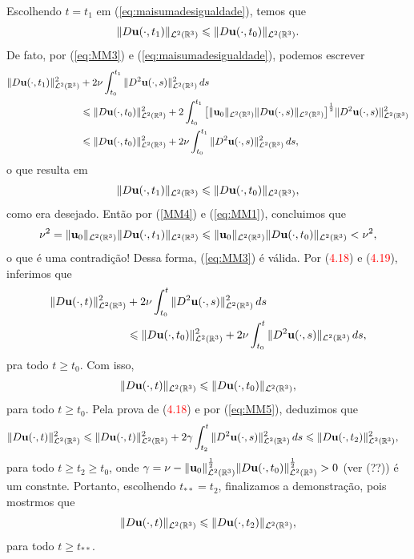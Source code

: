 \begin{prf}
    Escolhendo $t=t_1$ em (\ref{eq:maisumadesigualdade}), temos que
    \[
        \Vert D\mathbf{u}(\cdot,t_1) \Vert_{\mathcal{L}^2(\mathbb{R}^3)} \leqslant \Vert D\mathbf{u}(\cdot,t_0) \Vert_{\mathcal{L}^2(\mathbb{R}^3)}.
    \]
    De fato, por (\ref{eq:MM3}) e (\ref{eq:maisumadesigualdade}), podemos escrever
    \[
        \begin{aligned}
            \Vert D\mathbf{u}(\cdot,t_1) \Vert_{\mathcal{L}^2(\mathbb{R}^3)}^2 &+ 2\nu \int_{t_0}^{t_1} \Vert D^2\mathbf{u}(\cdot,s) \Vert_{\mathcal{L}^2(\mathbb{R}^3)}^2 \,ds\\
            &\leqslant \Vert D\mathbf{u}(\cdot,t_0) \Vert_{\mathcal{L}^2(\mathbb{R}^3)}^2 + 2 \int_{t_0}^{t_1} \big[ \Vert \mathbf{u}_0 \Vert_{\mathcal{L}^2(\mathbb{R}^3)}\Vert D\mathbf{u}(\cdot,s) \Vert_{\mathcal{L}^2(\mathbb{R}^3)} \big]^{\frac{1}{2}} \Vert D^2\mathbf{u}(\cdot,s) \Vert_{\mathcal{L}^2(\mathbb{R}^3)}^2\\
            &\leqslant \Vert D\mathbf{u}(\cdot,t_0) \Vert_{\mathcal{L}^2(\mathbb{R}^3)}^2 + 2\nu \int_{t_0}^{t_1} \Vert D^2\mathbf{u}(\cdot,s) \Vert_{\mathcal{L}^2(\mathbb{R}^3)}^2 \,ds,
        \end{aligned}
    \]
    o que resulta em
    \[
        \Vert D\mathbf{u}(\cdot,t_1) \Vert_{\mathcal{L}^2(\mathbb{R}^3)} \leqslant \Vert D\mathbf{u}(\cdot,t_0) \Vert_{\mathcal{L}^2(\mathbb{R}^3)},
    \]
    como era desejado. Então por (\ref{MM4}) e (\ref{eq:MM1}), concluimos que
    \[
        \nu^2 = \Vert \mathbf{u}_0 \Vert_{\mathcal{L}^2(\mathbb{R}^3)} \Vert D\mathbf{u}(\cdot,t_1) \Vert_{\mathcal{L}^2(\mathbb{R}^3)} \leqslant \Vert \mathbf{u}_0 \Vert_{\mathcal{L}^2(\mathbb{R}^3)} \Vert D\mathbf{u}(\cdot,t_0) \Vert_{\mathcal{L}^2(\mathbb{R}^3)} < \nu^2,
    \]
    o que é uma contradição! Dessa forma, (\ref{eq:MM3}) é válida.
    Por (\textcolor{red}{4.18}) e (\textcolor{red}{4.19}), inferimos que
    \[
        \begin{aligned}
            \Vert D\mathbf{u}(\cdot,t) \Vert_{\mathcal{L}^2(\mathbb{R}^3)}^2 &+ 2\nu \int_{t_0}^t \Vert D^2 \mathbf{u}(\cdot,s) \Vert_{\mathcal{L}^2(\mathbb{R}^3)}^2 \,ds\\
            &\leqslant \Vert D\mathbf{u}(\cdot,t_0) \Vert_{\mathcal{L}^2(\mathbb{R}^3)}^2 + 2\nu \int_{t_0}^t \Vert D^2 \mathbf{u}(\cdot,s) \Vert_{\mathcal{L}^2(\mathbb{R}^3)} \,ds,
        \end{aligned}
    \]
    pra todo $t \geqslant t_0$. Com isso,
    \begin{equation} \label{eq:MM5}
        \Vert D\mathbf{u}(\cdot,t) \Vert_{\mathcal{L}^2(\mathbb{R}^3)} \leqslant \Vert D\mathbf{u}(\cdot,t_0) \Vert_{\mathcal{L}^2(\mathbb{R}^3)},
    \end{equation}
    para todo $t \geqslant t_0$.
    Pela prova de (\textcolor{red}{4.18}) e por (\ref{eq:MM5}), deduzimos que
    \[
        \begin{aligned}
            \Vert D\mathbf{u}(\cdot,t) \Vert_{\mathcal{L}^2(\mathbb{R}^3)}^2 & \leqslant \Vert D\mathbf{u}(\cdot,t) \Vert_{\mathcal{L}^2(\mathbb{R}^3)}^2 + 2 \gamma \int_{t_2}^t \Vert D^2\mathbf{u}(\cdot,s) \Vert_{\mathcal{L}^2(\mathbb{R}^3)}^2 \,ds \leqslant \Vert D\mathbf{u}(\cdot,t_2) \Vert_{\mathcal{L}^2(\mathbb{R}^3)}^2,
        \end{aligned}
    \]
    para todo $t \geqslant t_2 \geqslant t_0$, onde $\gamma = \nu - \Vert \mathbf{u}_0 \Vert_{\mathcal{L}^2(\mathbb{R}^3)}^{\frac{1}{2}} \Vert D\mathbf{u}(\cdot,t_0) \Vert_{\mathcal{L}^2(\mathbb{R}^3)}^{\frac{1}{2}} > 0$ (ver (??)) é um constnte.
    Portanto, escolhendo $t_{**} = t_2$, finalizamos a demonstração, pois mostrmos que
    \[
        \Vert D\mathbf{u}(\cdot,t) \Vert_{\mathcal{L}^2(\mathbb{R}^3)} \leqslant \Vert D\mathbf{u}(\cdot,t_2) \Vert_{\mathcal{L}^2(\mathbb{R}^3)},
    \]
    para todo $t \geqslant t_{**}$.
\end{prf}

